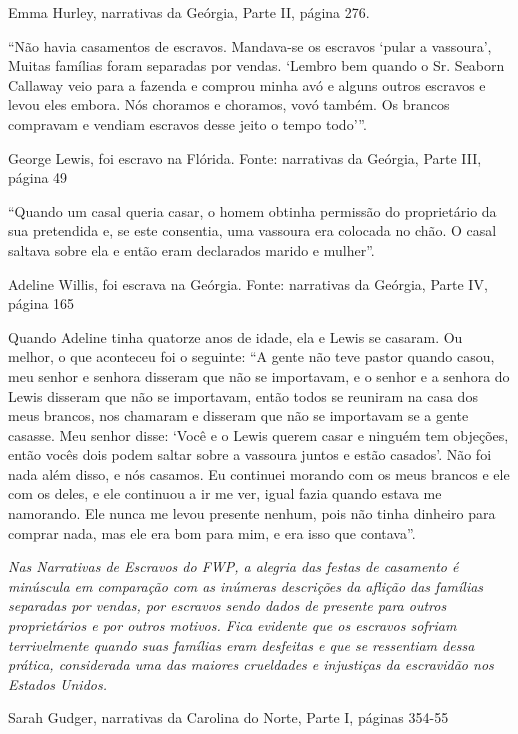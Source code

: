 Emma Hurley, narrativas da Geórgia, Parte II, página 276.

``Não havia casamentos de escravos. Mandava-se os escravos `pular a
vassoura', Muitas famílias foram separadas por vendas. `Lembro bem
quando o Sr. Seaborn Callaway veio para a fazenda e comprou minha avó e
alguns outros escravos e levou eles embora. Nós choramos e choramos,
vovó também. Os brancos compravam e vendiam escravos desse jeito o tempo
todo'''.

George Lewis, foi escravo na Flórida. Fonte: narrativas da Geórgia,
Parte III, página 49

``Quando um casal queria casar, o homem obtinha permissão do
proprietário da sua pretendida e, se este consentia, uma vassoura era
colocada no chão. O casal saltava sobre ela e então eram declarados
marido e mulher''.

Adeline Willis, foi escrava na Geórgia. Fonte: narrativas da Geórgia,
Parte IV, página 165

Quando Adeline tinha quatorze anos de idade, ela e Lewis se casaram. Ou
melhor, o que aconteceu foi o seguinte: ``A gente não teve pastor quando
casou, meu senhor e senhora disseram que não se importavam, e o senhor e
a senhora do Lewis disseram que não se importavam, então todos se
reuniram na casa dos meus brancos, nos chamaram e disseram que não se
importavam se a gente casasse. Meu senhor disse: `Você e o Lewis querem
casar e ninguém tem objeções, então vocês dois podem saltar sobre a
vassoura juntos e estão casados'. Não foi nada além disso, e nós
casamos. Eu continuei morando com os meus brancos e ele com os deles, e
ele continuou a ir me ver, igual fazia quando estava me namorando. Ele
nunca me levou presente nenhum, pois não tinha dinheiro para comprar
nada, mas ele era bom para mim, e era isso que contava''.

\emph{Nas Narrativas de Escravos do FWP, a alegria das festas de
casamento é minúscula em comparação com as inúmeras descrições da
aflição das famílias separadas por vendas, por escravos sendo dados de
presente para outros proprietários e por outros motivos. Fica evidente
que os escravos sofriam terrivelmente quando suas famílias eram
desfeitas e que se ressentiam dessa prática, considerada uma das maiores
crueldades e injustiças da escravidão nos Estados Unidos.}

Sarah Gudger, narrativas da Carolina do Norte, Parte I, páginas 354-55

